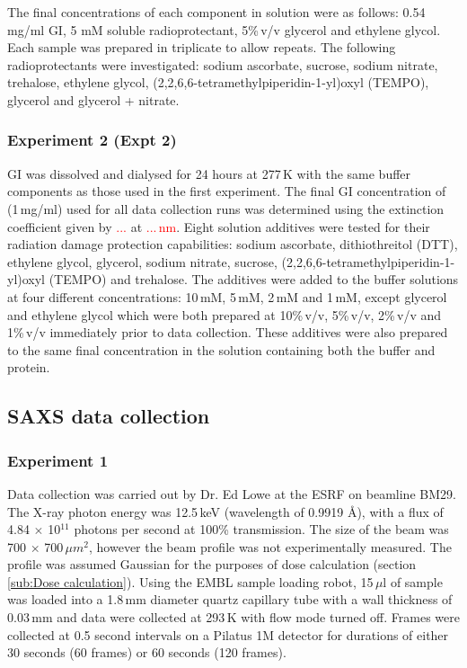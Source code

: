 The final concentrations of each component in solution were as follows:
0.54 mg/ml GI, 5 mM soluble radioprotectant, 5\%$\,$v/v glycerol and ethylene glycol.
Each sample was prepared in triplicate to allow repeats. The following radioprotectants were investigated: sodium ascorbate, sucrose, sodium nitrate, trehalose, ethylene glycol, (2,2,6,6-tetramethylpiperidin-1-yl)oxyl (TEMPO), glycerol and glycerol + nitrate.

\subsubsection{Experiment 2 (Expt 2)}
\label{subs:Experiment 2 - sample prep}
GI was dissolved and dialysed for 24 hours at 277$\,$K with the same buffer components as those used in the first experiment.
The final GI concentration of (1$\,$mg/ml) used for all data collection runs was determined using the extinction coefficient given by \textcolor{red}{...} at \textcolor{red}{$...\,$nm}.
Eight solution additives were tested for their radiation damage protection capabilities: sodium ascorbate, dithiothreitol (DTT), ethylene glycol, glycerol, sodium nitrate, sucrose, (2,2,6,6-tetramethylpiperidin-1-yl)oxyl (TEMPO) and trehalose.
The additives were added to the buffer solutions at four different concentrations: 10$\,$mM, 5$\,$mM, 2$\,$mM and 1$\,$mM, except glycerol and ethylene glycol which were both prepared at 10\%$\,$v/v, 5\%$\,$v/v, 2\%$\,$v/v and 1\%$\,$v/v immediately prior to data collection.
These additives were also prepared to the same final concentration in the solution containing both the buffer and protein.

\subsection{SAXS data collection}
\label{sub:SAXS data collection}

\subsubsection{Experiment 1}
\label{subs:Experiment 1- data col}
Data collection was carried out by Dr. Ed Lowe at the ESRF on beamline BM29.
The X-ray photon energy was 12.5$\,$keV (wavelength of 0.9919 \AA), with a flux of 4.84 $\times$ 10$^{\text{11}}$ photons per second at 100\% transmission.
The size of the beam was 700 $\times$ 700$\,\mu m^{\text{2}}$, however the beam profile was not experimentally measured.
The profile was assumed Gaussian for the purposes of dose calculation (section \ref{sub:Dose calculation}).
Using the EMBL sample loading robot, 15$\,\mu$l of sample was loaded into a 1.8$\,$mm diameter quartz capillary tube with a wall thickness of 0.03$\,$mm and data were collected at 293$\,$K with flow mode turned off.
Frames were collected at 0.5 second intervals on a Pilatus 1M detector for durations of either 30 seconds (60 frames) or 60 seconds (120  frames).


